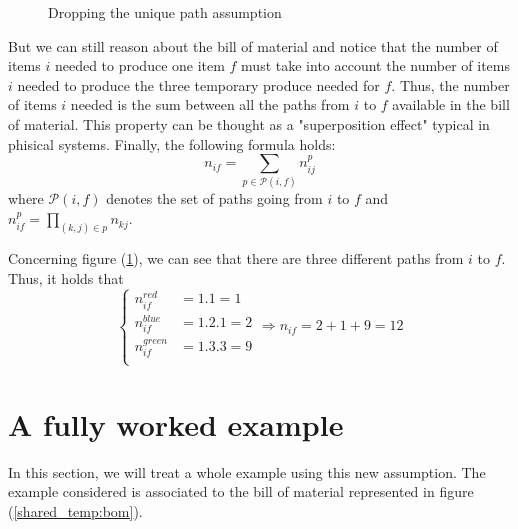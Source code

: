 \begin{figure}[h!]
{{
    }
    }
    \caption{\label{shared_temp:basic_bom}Dropping the unique path assumption}
\end{figure}%

But we can still reason about the bill of material and notice that the number of items $i$ needed to produce one item $f$ must take into account the number of items $i$ needed to produce the three temporary produce needed for $f$. Thus, the number of items $i$ needed is the sum between all the paths from $i$ to $f$ available in the bill of material. This property can be thought as a "superposition effect" typical in phisical systems. Finally, the following formula holds: \[ n_{if} = \sum_{ p \in\mathcal P(i,f)} n_{ij}^p \] where $\mathcal P(i,f)$ denotes the set of paths going from $i$ to $f$ and $n_{if}^p = \prod_{(k,j)\in p}n_{kj}$. 

Concerning figure (\ref{shared_temp:basic_bom}), we can see that there are three different paths from $i$ to $f$. Thus, it holds that
\[
    \begin{cases}
        n_{if}^{red} &= 1.1 = 1 \\
        n_{if}^{blue} &= 1.2.1 = 2 \\
        n_{if}^{green} &= 1.3.3=  9 \\
    \end{cases}
    \Rightarrow
    n_{if} = 2 + 1 + 9 = 12
\]

\section{A fully worked example}

In this section, we will treat a whole example using this new assumption. The example considered is associated to the bill of material represented in figure (\ref{shared_temp:bom}). 

